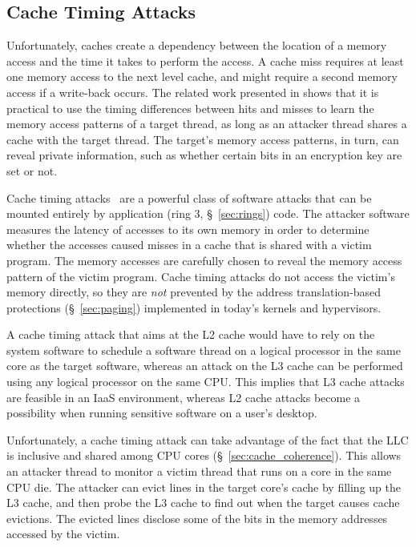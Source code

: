 \subsection{Cache Timing Attacks}
\label{sec:cache_timing}


Unfortunately, caches create a dependency between the location of a memory
access and the time it takes to perform the access. A cache miss requires
at least one memory access to the next level cache, and might require a second
memory access if a write-back occurs. The related work presented in
\cite{banescu2011cache} shows that it is practical to use the timing
differences between hits and misses to learn the memory access patterns of a
target thread, as long as an attacker thread shares a cache with the target
thread. The target's memory access patterns, in turn, can reveal private
information, such as whether certain bits in an encryption key are set or not.


Cache timing attacks~\cite{banescu2011cache} are a powerful class of software
attacks that can be mounted entirely by application
(ring 3, \S~\ref{sec:rings}) code. The attacker software measures the latency
of accesses to its own memory in order to determine whether the accesses caused
misses in a cache that is shared with a victim program. The memory accesses are
carefully chosen to reveal the memory access pattern of the victim program.
Cache timing attacks do not access the victim's memory directly, so they are
\emph{not} prevented by the address translation-based protections
(\S~\ref{sec:paging}) implemented in today's kernels and hypervisors.

A cache timing attack that aims at the L2 cache would have to rely on the
system software to schedule a software thread on a logical processor in the
same core as the target software, whereas an attack on the L3 cache can be
performed using any logical processor on the same CPU. This implies that L3
cache attacks are feasible in an IaaS environment, whereas L2 cache attacks
become a possibility when running sensitive software on a user's desktop.


Unfortunately, a cache timing attack can take advantage of the fact that the
LLC is inclusive and shared among CPU cores (\S~\ref{sec:cache_coherence}).
This allows an attacker thread to monitor a victim thread that runs on a core
in the same CPU die. The attacker can evict lines in the target core's cache by
filling up the L3 cache, and then probe the L3 cache to find out when the
target causes cache evictions.  The evicted lines disclose some of the bits in
the memory addresses accessed by the victim.

